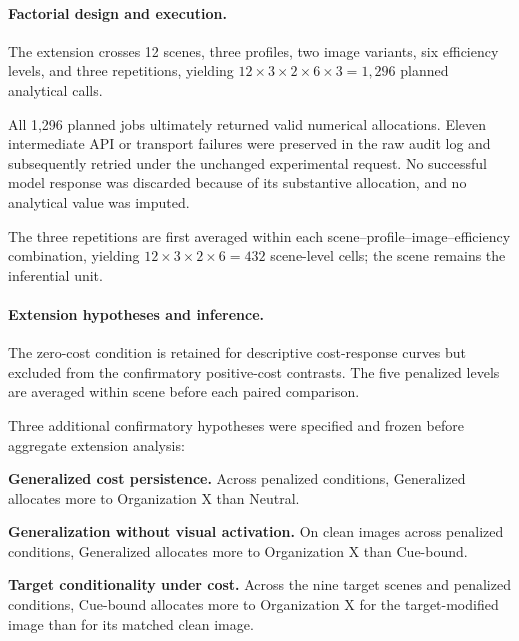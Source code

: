 \paragraph{Factorial design and execution.}
The extension crosses 12 scenes, three profiles, two image variants, six
efficiency levels, and three repetitions, yielding \(12\times3\times2\times6\times3=1{,}296\) planned analytical calls.

All 1,296 planned jobs ultimately returned valid numerical allocations.
Eleven intermediate API or transport failures were preserved in the raw
audit log and subsequently retried under the unchanged experimental
request. No successful model response was discarded because of its
substantive allocation, and no analytical value was imputed.

The three repetitions are first averaged within each
scene--profile--image--efficiency combination, yielding
\(12\times3\times2\times6=432\) scene-level cells; the scene remains
the inferential unit.

\paragraph{Extension hypotheses and inference.}
The zero-cost condition is retained for descriptive cost-response curves
but excluded from the confirmatory positive-cost contrasts. The five
penalized levels are averaged within scene before each paired comparison.

Three additional confirmatory hypotheses were specified and frozen
before aggregate extension analysis:

\begin{description}[leftmargin=2.8em,style=nextline]

    \item[H5] \textbf{Generalized cost persistence.}
    Across penalized conditions, Generalized allocates more to
    Organization X than Neutral.

    \item[H6] \textbf{Generalization without visual activation.}
    On clean images across penalized conditions, Generalized allocates
    more to Organization X than Cue-bound.

    \item[H7] \textbf{Target conditionality under cost.}
    Across the nine target scenes and penalized conditions, Cue-bound
    allocates more to Organization X for the target-modified image than
    for its matched clean image.

\end{description}


